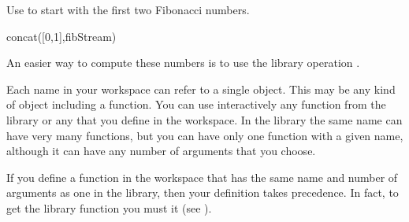\begin{xtc}
\begin{xtccomment}
Use  to start with the first two
Fibonacci numbers.
\end{xtccomment}
\begin{spadsrc}
concat([0,1],fibStream) 
\end{spadsrc}
\begin{TeXOutput}
\begin{fricasmath}{15}
%
\end{fricasmath}
\end{TeXOutput}
\end{xtc}
\begin{xtc}
\begin{xtccomment}
An easier way to compute these numbers is to
use the library operation .
\end{xtccomment}
\begin{spadsrc}
\end{spadsrc}
\begin{TeXOutput}
\begin{fricasmath}{16}
%
\end{fricasmath}
\end{TeXOutput}
\end{xtc}


Each name in your workspace can refer to a single object.
This may be any kind of object including a function.
You can use interactively any function from the library or any that you
define in the workspace.
In the library the same name can have very many functions, but you
can have only one function with a given name, although it can have any
number of arguments that you choose.

If you define a function in the workspace that has the same name and number
of arguments as one in the library, then your definition takes precedence.
In fact, to get the library function you must
 it (see ).

